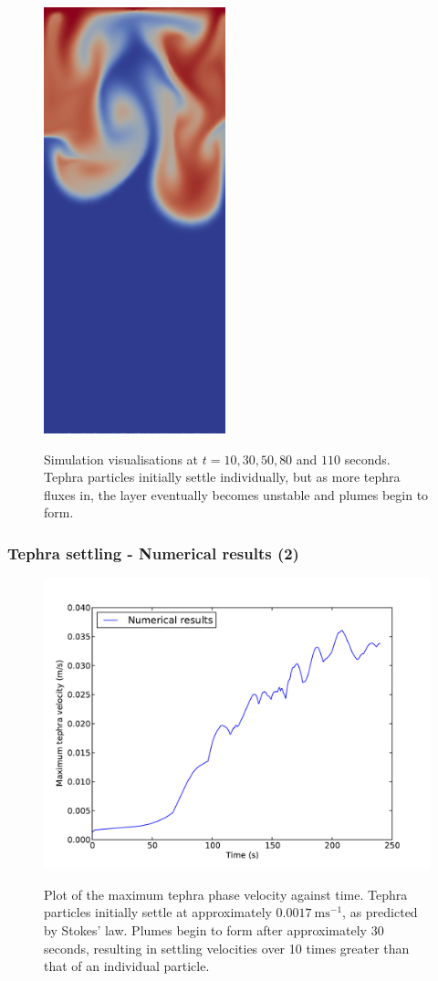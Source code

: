 \begin{frame}
\begin{figure}[H]
                \includegraphics[scale=0.2]{tephra_settling/tephra_fine_5.png}
   \label{fig:tephra_adaptive}
   \caption{Simulation visualisations at $t = 10, 30, 50, 80$ and $110$ seconds. Tephra particles initially settle individually, but as more tephra fluxes in, the layer eventually becomes unstable and plumes begin to form.}
\end{figure}
\end{frame}

\begin{frame}
  \frametitle{Tephra settling - Numerical results (2)}
\begin{figure}[H]
        \centering
                \includegraphics[scale=0.27]{tephra_settling/tephra_velocity.pdf}
   \label{fig:tephra_velocity}
   \caption{Plot of the maximum tephra phase velocity against time. Tephra particles initially settle at approximately $0.0017\ \mathrm{ms^{-1}}$, as predicted by Stokes' law. Plumes begin to form after approximately 30 seconds, resulting in settling velocities over 10 times greater than that of an individual particle.}
\end{figure}
\end{frame}


